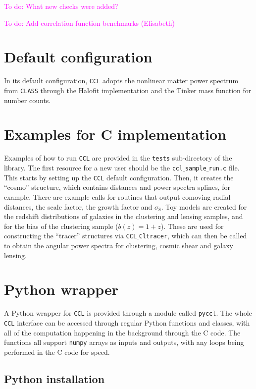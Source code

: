 \documentclass[\docopts]{\docclass}
\newcommand{\todo}[1]{\textcolor{magenta}{To do: #1}}
\begin{document}
\todo{What new checks were added?}

\todo{Add correlation function benchmarks (Elisabeth)}


\section{Default configuration}
\label{sec:default}

In its default configuration, {\tt CCL} adopts the nonlinear matter power spectrum from {\tt CLASS} through the Halofit implementation and the Tinker mass function for number counts.


\section{Examples for C implementation}
\label{sec:example}

Examples of how to run {\tt CCL} are provided in the {\tt tests} sub-directory of the library. The first resource for a new user should be the {\tt ccl$\_$sample$\_$run.c} file. This starts by setting up the {\tt CCL} default configuration. Then, it creates the ``cosmo'' structure, which contains distances and power spectra splines, for example. There are example calls for routines that output comoving radial distances, the scale factor, the growth factor and $\sigma_8$. Toy models are created for the redshift distributions of galaxies in the clustering and lensing samples, and for the bias of the clustering sample ($b(z)=1+z$). These are used for constructing the ``tracer'' structures via {\tt CCL$\_$Cltracer}, which can then be called to obtain the angular power spectra for clustering, cosmic shear and galaxy lensing.


\section{Python wrapper}
\label{sec:python}

A Python wrapper for {\tt CCL} is provided through a module called {\tt pyccl}. The whole {\tt CCL} interface can be accessed through regular Python functions and classes, with all of the computation happening in the background through the C code. The functions all support {\tt numpy} arrays as inputs and outputs, with any loops being performed in the C code for speed.

\subsection{Python installation}
\label{sec:python:install}
\end{document}
